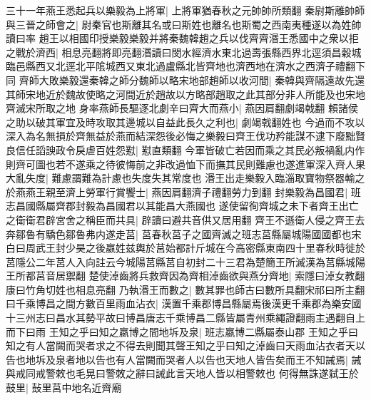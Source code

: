 三十一年燕王悉起兵以樂毅為上將軍|{
	上將軍猶春秋之元帥帥所類翻}
秦尉斯離帥師與三晉之師會之|{
	尉秦官也斯離其名或曰斯姓也離名也斯蜀之西南夷種遂以為姓帥讀曰率}
趙王以相國印授樂毅樂毅并將秦魏韓趙之兵以伐齊齊湣王悉國中之衆以拒之戰於濟西|{
	相息亮翻將即亮翻湣讀曰閔水經濟水東北過壽張縣西界北逕須昌穀城臨邑縣西又北逕北平隂城西又東北過盧縣北皆齊地也濟西地在濟水之西濟子禮翻下同}
齊師大敗樂毅還秦韓之師分魏師以略宋地部趙師以收河間|{
	秦韓與齊隔遠故先還其師宋地近於魏故使略之河間近於趙故以方略部趙取之此其部分非人所能及也宋地齊滅宋所取之地}
身率燕師長驅逐北劇辛曰齊大而燕小|{
	燕因肩翻劇竭戟翻}
賴諸侯之助以破其軍宜及時攻取其邊城以自益此長久之利也|{
	劇竭戟翻姓也}
今過而不攻以深入為名無損於齊無益於燕而結深怨後必悔之樂毅曰齊王伐功矜能謀不逮下廢黜賢良信任謟諛政令戾虐百姓怨懟|{
	懟直類翻}
今軍皆破亡若因而乘之其民必叛禍亂内作則齊可圖也若不遂乘之待彼悔前之非改過恤下而撫其民則難慮也遂進軍深入齊人果大亂失度|{
	難慮謂難為計慮也失度失其常度也}
湣王出走樂毅入臨淄取寶物祭器輸之於燕燕王親至濟上勞軍行賞饗士|{
	燕因肩翻濟子禮翻勞力到翻}
封樂毅為昌國君|{
	班志昌國縣屬齊郡封毅為昌國君以其能昌大燕國也}
遂使留徇齊城之未下者齊王出亡之衛衛君辟宮舍之稱臣而共具|{
	辟讀曰避共音供又居用翻}
齊王不遜衛人侵之齊王去奔鄒魯有驕色鄒魯弗内遂走莒|{
	莒春秋莒子之國齊滅之班志莒縣屬城陽國國都也宋白曰周武王封少昊之後嬴姓兹輿於莒始都計斤城在今高密縣東南四十里春秋時徙於莒隱公二年莒人入向註云今城陽莒縣莒自初封二十三君為楚簡王所滅漢為莒縣城陽王所都莒音居禦翻}
楚使淖齒將兵救齊因為齊相淖齒欲與燕分齊地|{
	索隱曰淖女教翻康曰竹角切姓也相息亮翻}
乃執湣王而數之|{
	數其罪也師古曰數所具翻宋祁曰所主翻}
曰千乘博昌之間方數百里雨血沾衣|{
	漢置千乘郡博昌縣屬焉後漢更千乘郡為樂安國十三州志曰昌水其勢平故曰博昌唐志千乘博昌二縣皆屬青州乘繩證翻雨主遇翻自上而下曰雨}
王知之乎曰知之嬴博之間地坼及泉|{
	班志嬴博二縣屬泰山郡}
王知之乎曰知之有人當闕而哭者求之不得去則聞其聲王知之乎曰知之淖齒曰天雨血沾衣者天以告也地坼及泉者地以告也有人當闕而哭者人以告也天地人皆告矣而王不知誡焉|{
	誡與戒同戒警敕也毛晃曰警敇之辭曰誡此言天地人皆以相警敕也}
何得無誅遂弑王於鼓里|{
	鼔里莒中地名近齊廟}


